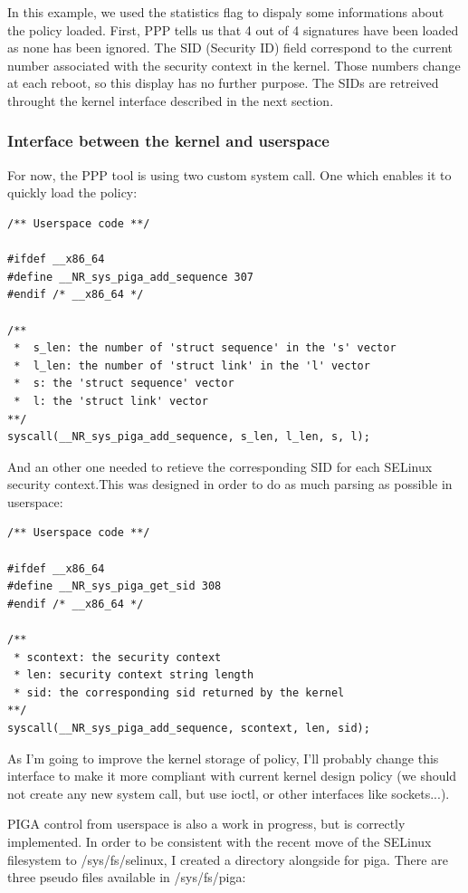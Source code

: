 \documentclass[pdftex,a4paper,titlepage,11pt]{article}
\begin{document}
\smallskip

In this example, we used the statistics flag to dispaly some informations about
the policy loaded. First, PPP tells us that 4 out of 4 signatures have been
loaded as none has been ignored. The SID (Security ID) field correspond to the
current number associated with the security context in the kernel. Those numbers
change at each reboot, so this display has no further purpose. The SIDs are
retreived throught the kernel interface described in the next section.

\subsubsection{Interface between the kernel and userspace}

For now, the PPP tool is using two custom system call. One which enables it to
quickly load the policy:

\begin{lstlisting}
/** Userspace code **/

#ifdef __x86_64
#define __NR_sys_piga_add_sequence 307
#endif /* __x86_64 */

/**
 *  s_len: the number of 'struct sequence' in the 's' vector
 *  l_len: the number of 'struct link' in the 'l' vector
 *  s: the 'struct sequence' vector
 *  l: the 'struct link' vector
**/
syscall(__NR_sys_piga_add_sequence, s_len, l_len, s, l);
\end{lstlisting}

And an other one needed to retieve the corresponding SID for each SELinux
security context.This was designed in order to do as much parsing as possible in
userspace:

\begin{lstlisting}
/** Userspace code **/

#ifdef __x86_64
#define __NR_sys_piga_get_sid 308
#endif /* __x86_64 */

/**
 * scontext: the security context
 * len: security context string length
 * sid: the corresponding sid returned by the kernel
**/
syscall(__NR_sys_piga_add_sequence, scontext, len, sid);
\end{lstlisting}

As I'm going to improve the kernel storage of policy, I'll probably change this
interface to make it more compliant with current kernel design policy (we should
not create any new system call, but use ioctl, or other interfaces like
sockets...).

PIGA control from userspace is also a work in progress, but is correctly
implemented. In order to be consistent with the recent move of the SELinux
filesystem to /sys/fs/selinux, I created a directory alongside for piga. There
are three pseudo files available in /sys/fs/piga: %
\end{document}
